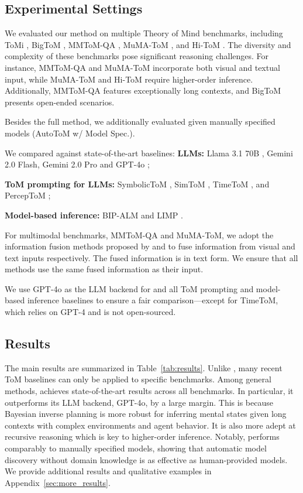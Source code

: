 \subsection{Experimental Settings}



We evaluated our method on multiple Theory of Mind benchmarks, including ToMi \citep{le2019revisiting}, BigToM \citep{gandhi2024understanding}, MMToM-QA \cite{jin2024mmtom}, MuMA-ToM \citep{shi2024muma}, and Hi-ToM \cite{he2023hi}. The diversity and complexity of these benchmarks pose significant reasoning challenges. For instance, MMToM-QA and MuMA-ToM incorporate both visual and textual input, while MuMA-ToM and Hi-ToM require higher-order inference. Additionally, MMToM-QA features exceptionally long contexts, and BigToM presents open-ended scenarios.



Besides the full \ours method, we additionally evaluated \ours given manually specified models (AutoToM w/ Model Spec.). 

We compared \ours against state-of-the-art baselines:
    \textbf{LLMs:} Llama 3.1 70B \citep{dubey2024llama}, Gemini 2.0 Flash, Gemini 2.0 Pro \cite{team2023gemini} and GPT-4o \cite{achiam2023gpt};
    
     \textbf{ToM prompting for LLMs:} SymbolicToM \cite{sclar2023minding}, SimToM \cite{wilf2023think}, TimeToM \cite{hou2024timetom}, and PercepToM \citep{jung2024perceptions};
 
  \textbf{Model-based inference:} BIP-ALM \cite{jin2024mmtom} and LIMP \cite{shi2024muma}.


For multimodal benchmarks, MMToM-QA and MuMA-ToM, we adopt the information fusion methods proposed by \citet{jin2024mmtom} and \citet{shi2024muma} to fuse information from visual and text inputs respectively. The fused information is in text form. We ensure that all methods use the same fused information as their input.


We use GPT-4o as the LLM backend for \ours and all ToM prompting and model-based inference baselines to ensure a fair comparison—except for TimeToM, which relies on GPT-4 and is not open-sourced.


\subsection{Results}
The main results are summarized in Table~\ref{tab:results}. Unlike \ours, many recent ToM baselines can only be applied to specific benchmarks. Among general methods, \ours achieves state-of-the-art results across all benchmarks. In particular, it outperforms its LLM backend, GPT-4o, by a large margin. This is because Bayesian inverse planning is more robust for inferring mental states given long contexts with complex environments and agent behavior. It is also more adept at recursive reasoning which is key to higher-order inference. Notably, \ours performs comparably to manually specified models, showing that automatic model discovery without domain knowledge is as effective as human-provided models. We provide additional results and qualitative examples in Appendix~\ref{sec:more_results}.


